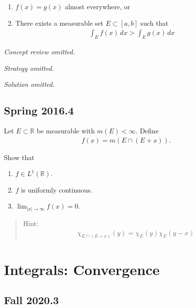 \begin{enumerate}
\def\labelenumi{\arabic{enumi}.}
\tightlist
\item
  \(f(x) = g(x)\) almost everywhere, or
\item
  There exists a measurable set \(E \subset [a, b]\) such that
  \begin{align*}
  \int _{E} f(x) \, dx > \int _{E} g(x) \, dx
  \end{align*}
\end{enumerate}

\emph{Concept review omitted.}

\emph{Strategy omitted.}

\emph{Solution omitted.}

\hypertarget{spring-2016.4}{%
\subsection{Spring 2016.4}\label{spring-2016.4}}

Let \(E \subset {\mathbb{R}}\) be measurable with \(m(E) < \infty\).
Define
\begin{align*}
f(x)=m(E \cap(E+x)).
\end{align*}

Show that

\begin{enumerate}
\def\labelenumi{\arabic{enumi}.}
\tightlist
\item
  \(f\in L^1({\mathbb{R}})\).
\item
  \(f\) is uniformly continuous.
\item
  \(\lim _{|x| \to \infty} f(x) = 0\).
\end{enumerate}

\begin{quote}
Hint:
\begin{align*}
\chi_{E \cap(E+x)}(y)=\chi_{E}(y) \chi_{E}(y-x)
\end{align*}
\end{quote}

\hypertarget{integrals-convergence}{%
\section{Integrals: Convergence}\label{integrals-convergence}}

\hypertarget{fall-2020.3}{%
\subsection{Fall 2020.3}\label{fall-2020.3}}

